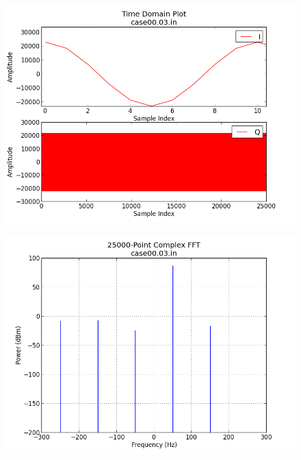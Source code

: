 \documentclass{article}
\begin{document}
	\begin{figure}[ht]
		\centering
		\begin{minipage}{.5\textwidth}
			\centering\includegraphics[width=1.0\linewidth]{input_time_R2048}
			\label{fig:input_time_R2048}
		\end{minipage}%
		\begin{minipage}{.5\textwidth}
			\centering\includegraphics[width=1.0\linewidth]{input_freq_R2048}
			\label{fig:input_freq_R2048}
		\end{minipage}
	\end{figure}
\end{document}
